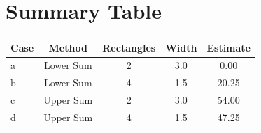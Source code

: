 \documentclass[12pt]{article}
\begin{document}
\section*{Summary Table}
\begin{center}
\begin{tabular}{lcccc}
\toprule
\textbf{Case} & \textbf{Method} & \textbf{Rectangles} & \textbf{Width} & \textbf{Estimate} \\
\midrule
a & Lower Sum & 2 & 3.0 & 0.00 \\
b & Lower Sum & 4 & 1.5 & 20.25 \\
c & Upper Sum & 2 & 3.0 & 54.00 \\
d & Upper Sum & 4 & 1.5 & 47.25 \\
\bottomrule
\end{tabular}
\end{center}
\end{document}
